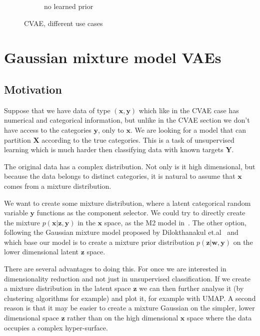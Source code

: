 \documentclass[11pt, a4paper]{report}
\theoremstyle{plain}
\theoremstyle{definition}
\theoremstyle{remark}
\newcommand{\X}{\mathbf{X}}
\newcommand{\x}{\mathbf{x}}
\newcommand{\z}{\mathbf{z}}
\newcommand{\Y}{\mathbf{Y}}
\newcommand{\y}{\mathbf{y}}
\newcommand{\w}{\mathbf{w}}
\begin{document}
\begin{figure}[!h]
\begin{framed}
\begin{subfigure}[b]{0.33\textwidth}
\caption{no learned prior}
\end{subfigure}
\caption{CVAE, different use cases}
\label{fig:cvaeumap}
\end{framed}
\end{figure}

\chapter{Gaussian mixture model VAEs}
\section{Motivation}

Suppose that we have data of type $(\x,\y)$ which like in the CVAE case has numerical and 
categorical information, but unlike in the CVAE section we don't have access to
the categories $\y$, only to $\x$. 
We are looking for a model that can partition
$\X$ according to the true categories.
This is a task of unsupervised learning which is much harder then classifying
data with known targets $\Y$.

The original data has a complex distribution. Not only is it high dimensional,
but because the data belongs to distinct categories, it is natural to assume
that $\x$ comes from a mixture distribution.

We want to create some mixture distribution, where a latent categorical random
variable $\y$ functions as the component selector. We could try to directly
create the mixture $p(\x | \z, \y)$ in the $\x$ space, as the M2 model
in~\cite{kingma2014semi}.
The other option, following the Gaussian mixture model proposed by
Dilokthanakul et.al~\cite{dilokthanakul2016deep} and which base our model
is to create a mixture prior distribution $p(\z | \w, \y)$ on the lower
dimensional latent $\z$ space.

There are several advantages to doing this. For once we are interested in
dimensionality reduction and not just in unsupervised classification. If we
create a mixture distribution in the latent space $\z$ we can then further
analyse it (by clustering algorithms for example) and plot it, for example with
UMAP. A second reason is that it may be easier to create a mixture Gaussian on
the simpler, lower dimensional space $\z$ rather than on the high dimensional
$\x$ space where the data occupies a complex hyper-surface.

%
\end{document}
